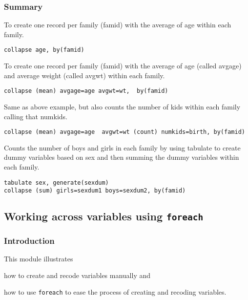 \subsubsection{Summary}

\begin{compactitem}
\item To create one record per family (famid) with the average of age within each family.
\begin{lstlisting}
collapse age, by(famid)
\end{lstlisting}
\item To create one record per family (famid) with the average of age (called avgage) and average weight (called avgwt) within each family.
\begin{lstlisting}
collapse (mean) avgage=age avgwt=wt,  by(famid)
\end{lstlisting}
\item Same as above example, but also counts the number of kids within each family calling that numkids.
\begin{lstlisting}
collapse (mean) avgage=age  avgwt=wt (count) numkids=birth, by(famid)
\end{lstlisting}
\item Counts the number of boys and girls in each family by using tabulate to create dummy variables based on sex and then summing the dummy variables within each family.
\begin{lstlisting}
tabulate sex, generate(sexdum)
collapse (sum) girls=sexdum1 boys=sexdum2, by(famid)
\end{lstlisting}
\end{compactitem}

\subsection{Working across variables using \lstinline{foreach}}

\subsubsection{Introduction}

This module illustrates
\begin{compactenum}
\item how to create and recode variables manually and
\item how to use \lstinline{foreach} to ease the process of creating and recoding variables.
\end{compactenum}

